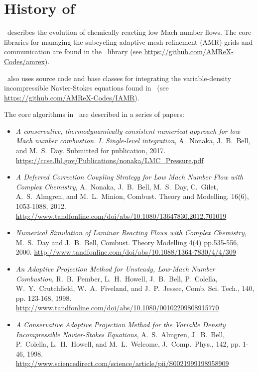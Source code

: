 \section{History of \pelelm}

\pelelm\ describes the evolution of chemically reacting low Mach number flows.
The core libraries for managing the subcycling adaptive mesh refinement (AMR)
grids and communication are found in the \amrex\ library
(see \url{https://github.com/AMReX-Codes/amrex}).

\pelelm\ also uses source code and base classes for integrating the
variable-density incompressible Navier-Stokes equations found in \iamr\ 
(see \url{https://github.com/AMReX-Codes/IAMR}).

The core algorithms in \pelelm\ are described in a series of papers:
\begin{itemize}

\item {\it A conservative, thermodynamically consistent numerical approach for low Mach number 
combustion. I. Single-level integration},
A.~Nonaka, J.~B.~Bell, and M.~S.~Day.  Submitted for publication, 2017.
\url{https://ccse.lbl.gov/Publications/nonaka/LMC_Pressure.pdf}

\item {\it A Deferred Correction Coupling Strategy for Low Mach Number Flow with Complex Chemistry},
A.~Nonaka, J.~B.~Bell, M.~S.~Day, C.~Gilet, A.~S.~Almgren, and M.~L.~Minion,
Combust. Theory and Modelling, 16(6), 1053-1088, 2012. 
\url{http://www.tandfonline.com/doi/abs/10.1080/13647830.2012.701019} \cite{LMC_SDC}

\item {\it Numerical Simulation of Laminar Reacting Flows with Complex Chemistry},
M.~S.~Day and J.~B.~Bell,
Combust. Theory Modelling 4(4) pp.535-556, 2000.
\url{http://www.tandfonline.com/doi/abs/10.1088/1364-7830/4/4/309} \cite{DayBell:2000}

\item {\it An Adaptive Projection Method for Unsteady, Low-Mach Number Combustion}, 
R.~B.~Pember, L.~H.~Howell, J.~B.~Bell, P.~Colella, W.~Y.~Crutchfield, W.~A.~Fiveland, and J.~P.~Jessee,
Comb. Sci. Tech., 140, pp. 123-168, 1998.
\url{http://www.tandfonline.com/doi/abs/10.1080/00102209808915770} \cite{pember-flame}

\item {\it A Conservative Adaptive Projection Method for the Variable Density Incompressible Navier-Stokes Equations},
A.~S.~Almgren, J.~B.~Bell, P.~Colella, L.~H.~Howell, and M.~L.~Welcome,
J.~Comp.~Phys., 142, pp. 1-46, 1998.
\url{http://www.sciencedirect.com/science/article/pii/S0021999198958909} \cite{IAMR}

\end{itemize}         


